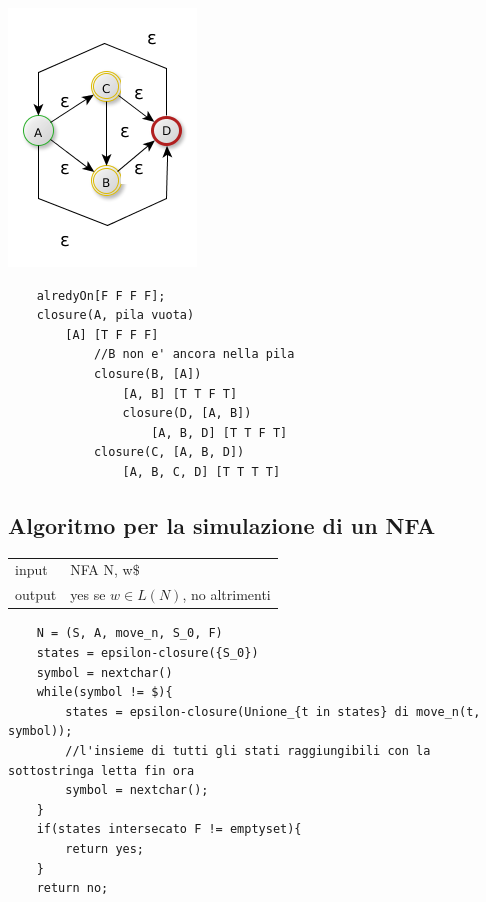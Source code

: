 \begin{center}
	\includegraphics[scale=0.5]{Chapters/Img/c02_02.png}\\
\end{center} 

\begin{lstlisting}
    alredyOn[F F F F];
    closure(A, pila vuota)
        [A] [T F F F]
            //B non e' ancora nella pila
            closure(B, [A])
                [A, B] [T T F T]
                closure(D, [A, B])
                    [A, B, D] [T T F T]
            closure(C, [A, B, D])
                [A, B, C, D] [T T T T]
\end{lstlisting}

\subsection{Algoritmo per la simulazione di un NFA}
\begin{center}
    \begin{tabular}{ll}
        input & NFA N, w$\$$\\
        output & yes se $w \in L(N)$, no altrimenti\\ 
    \end{tabular}
\end{center}
\begin{lstlisting}
    N = (S, A, move_n, S_0, F)
    states = epsilon-closure({S_0})
    symbol = nextchar()
    while(symbol != $){
        states = epsilon-closure(Unione_{t in states} di move_n(t, symbol));
        //l'insieme di tutti gli stati raggiungibili con la sottostringa letta fin ora
        symbol = nextchar();
    }
    if(states intersecato F != emptyset){
        return yes;
    }
    return no;
\end{lstlisting}

